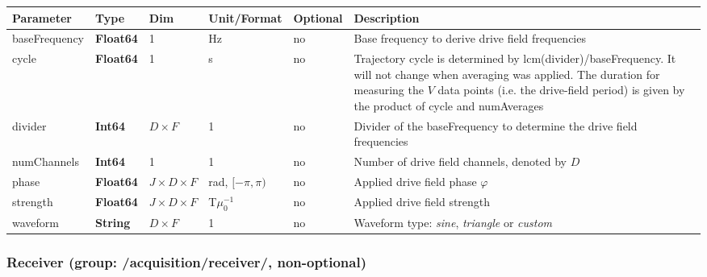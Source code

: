 \documentclass[landscape,a4paper]{article} %
\newcommand{\inltab}[1]{{\ttfamily\bfseries\color{blue}#1}}
\newcommand{\inlvar}[1]{{\ttfamily#1}}
\begin{document}
\setlength\extrarowheight{5pt}
\noindent \begin{tabularx}{\columnwidth}{lllllX} 
\textbf{Parameter} & \textbf{Type} & \textbf{Dim} & \textbf{Unit/Format} & \textbf{Optional} & \textbf{Description} \\ \hline 
\inlvar{baseFrequency} & \inltab{Float64} & 1 & Hz & no & Base frequency to derive drive field frequencies \\ \hline
\inlvar{cycle} & \inltab{Float64} & 1 & s & no & Trajectory cycle is determined by lcm(\inlvar{divider})/\inlvar{baseFrequency}. It will not change when averaging was applied. The duration for measuring the $V$ data points (i.e. the drive-field period) is given by the product of \inlvar{cycle} and \inlvar{numAverages} \\ \hline
\inlvar{divider} & \inltab{Int64} & $D \times F$ & 1 & no & Divider of the \inlvar{baseFrequency} to determine the drive field frequencies \\ \hline
\inlvar{numChannels} & \inltab{Int64} & 1 & 1 & no & Number of drive field channels, denoted by $D$ \\ \hline
\inlvar{phase} & \inltab{Float64} & $J \times D \times F$ & rad, $[-\pi,\pi)$ & no & Applied drive field phase $\varphi$\\ \hline
\inlvar{strength} & \inltab{Float64} & $J \times D \times F $ & T$\mu_0^{-1}$ & no & Applied drive field strength \\ \hline
\inlvar{waveform} & \inltab{String} & $D \times F$ & 1 & no & Waveform type: \textit{sine}, \textit{triangle} or \textit{custom} \\ \hline
\end{tabularx}
\setlength\extrarowheight{0pt}


\subsubsection{Receiver (group: \inlvar{/acquisition/receiver/}, non-optional)}
\end{document}
